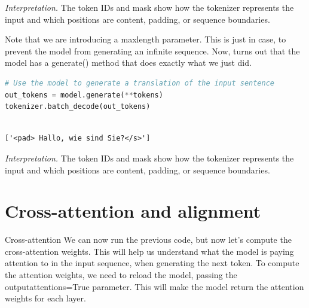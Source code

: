 \documentclass[../labs.tex]{subfiles}
\begin{document}
\noindent\emph{Interpretation.} The token IDs and mask show how the tokenizer represents the input and which positions are content, padding, or sequence boundaries.



\noindent Note that we are introducing a maxlength parameter. This is just in case, to prevent the model from generating an infinite sequence. Now, turns out that the model has a generate() method that does exactly what we just did.

\begin{lstlisting}[language=Python,basicstyle=\ttfamily\scriptsize,breaklines=true,breakatwhitespace=false,columns=fullflexible,keepspaces=true,numbers=none]
# Use the model to generate a translation of the input sentence
out_tokens = model.generate(**tokens)
tokenizer.batch_decode(out_tokens)
\end{lstlisting}

\hypertarget{res:lab02-text-01-t5-ipynb-87-eaa35efa5da6}{}

\begin{lstlisting}[basicstyle=\ttfamily\scriptsize,breaklines=true,breakatwhitespace=false,columns=fullflexible,keepspaces=true]

['<pad> Hallo, wie sind Sie?</s>']

\end{lstlisting}

\noindent\emph{Interpretation.} The token IDs and mask show how the tokenizer represents the input and which positions are content, padding, or sequence boundaries.

\section{Cross-attention and alignment}



\noindent Cross-attention We can now run the previous code, but now let's compute the cross-attention weights. This will help us understand what the model is paying attention to in the input sequence, when generating the next token. To compute the attention weights, we need to reload the model, passing the outputattentions=True parameter. This will make the model return the attention weights for each layer.
\end{document}
